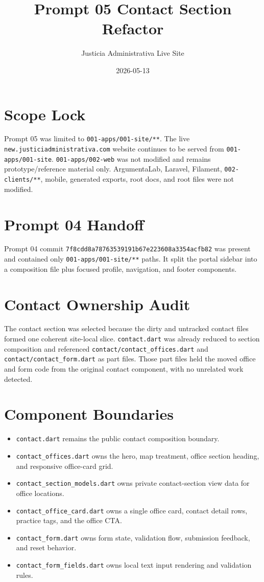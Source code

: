 \documentclass[11pt]{article}
\title{Prompt 05 Contact Section Refactor}
\author{Justicia Administrativa Live Site}
\date{2026-05-13}
\begin{document}
\maketitle

\section*{Scope Lock}
Prompt 05 was limited to \texttt{001-apps/001-site/**}. The live
\texttt{new.justiciadministrativa.com} website continues to be served from
\texttt{001-apps/001-site}. \texttt{001-apps/002-web} was not modified and
remains prototype/reference material only. ArgumentaLab, Laravel, Filament,
\texttt{002-clients/**}, mobile, generated exports, root docs, and root files
were not modified.

\section*{Prompt 04 Handoff}
Prompt 04 commit
\texttt{7f8cdd8a78763539191b67e223608a3354acfb82} was present and contained
only \texttt{001-apps/001-site/**} paths. It split the portal sidebar into a
composition file plus focused profile, navigation, and footer components.

\section*{Contact Ownership Audit}
The contact section was selected because the dirty and untracked contact files
formed one coherent site-local slice. \texttt{contact.dart} was already reduced
to section composition and referenced \texttt{contact/contact\_offices.dart}
and \texttt{contact/contact\_form.dart} as part files. Those part files held
the moved office and form code from the original contact component, with no
unrelated work detected.

\section*{Component Boundaries}
\begin{itemize}
  \item \texttt{contact.dart} remains the public contact composition boundary.
  \item \texttt{contact\_offices.dart} owns the hero, map treatment, office
  section heading, and responsive office-card grid.
  \item \texttt{contact\_section\_models.dart} owns private contact-section
  view data for office locations.
  \item \texttt{contact\_office\_card.dart} owns a single office card, contact
  detail rows, practice tags, and the office CTA.
  \item \texttt{contact\_form.dart} owns form state, validation flow,
  submission feedback, and reset behavior.
  \item \texttt{contact\_form\_fields.dart} owns local text input rendering and
  validation rules.
\end{itemize}
\end{document}

